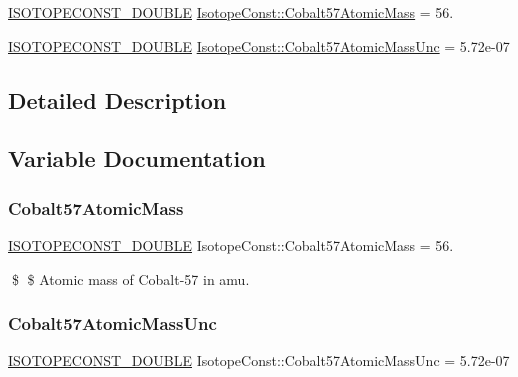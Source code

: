 \begin{DoxyCompactItemize}
\item 
\mbox{\hyperlink{group___isotope_const-_macros_ga8f45a7272ce02c0b4c65c44636ed719a}{I\+S\+O\+T\+O\+P\+E\+C\+O\+N\+S\+T\+\_\+\+D\+O\+U\+B\+LE}} \mbox{\hyperlink{group___isotope_const-_cobalt-_co57_gaa7eccc60a44c5eef96a9cfcf64e86387}{Isotope\+Const\+::\+Cobalt57\+Atomic\+Mass}} = 56.
\item 
\mbox{\hyperlink{group___isotope_const-_macros_ga8f45a7272ce02c0b4c65c44636ed719a}{I\+S\+O\+T\+O\+P\+E\+C\+O\+N\+S\+T\+\_\+\+D\+O\+U\+B\+LE}} \mbox{\hyperlink{group___isotope_const-_cobalt-_co57_gadbec06c0ff1ca338b319e4f96a5a420e}{Isotope\+Const\+::\+Cobalt57\+Atomic\+Mass\+Unc}} = 5.\+72e-\/07
\end{DoxyCompactItemize}


\subsection{Detailed Description}


\subsection{Variable Documentation}
\mbox{\label{group___isotope_const-_cobalt-_co57_gaa7eccc60a44c5eef96a9cfcf64e86387}} 
\subsubsection{\texorpdfstring{Cobalt57\+Atomic\+Mass}{Cobalt57AtomicMass}}
{\footnotesize\ttfamily \mbox{\hyperlink{group___isotope_const-_macros_ga8f45a7272ce02c0b4c65c44636ed719a}{I\+S\+O\+T\+O\+P\+E\+C\+O\+N\+S\+T\+\_\+\+D\+O\+U\+B\+LE}} Isotope\+Const\+::\+Cobalt57\+Atomic\+Mass = 56.}

\$ \$ Atomic mass of Cobalt-\/57 in amu. \mbox{\label{group___isotope_const-_cobalt-_co57_gadbec06c0ff1ca338b319e4f96a5a420e}} 
\subsubsection{\texorpdfstring{Cobalt57\+Atomic\+Mass\+Unc}{Cobalt57AtomicMassUnc}}
{\footnotesize\ttfamily \mbox{\hyperlink{group___isotope_const-_macros_ga8f45a7272ce02c0b4c65c44636ed719a}{I\+S\+O\+T\+O\+P\+E\+C\+O\+N\+S\+T\+\_\+\+D\+O\+U\+B\+LE}} Isotope\+Const\+::\+Cobalt57\+Atomic\+Mass\+Unc = 5.\+72e-\/07}

